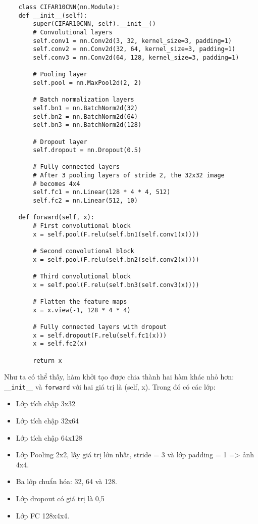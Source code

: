 \documentclass[../main.tex]{subfiles}
\begin{document}
\begin{verbatim}
    class CIFAR10CNN(nn.Module):
    def __init__(self):
        super(CIFAR10CNN, self).__init__()
        # Convolutional layers
        self.conv1 = nn.Conv2d(3, 32, kernel_size=3, padding=1)
        self.conv2 = nn.Conv2d(32, 64, kernel_size=3, padding=1)
        self.conv3 = nn.Conv2d(64, 128, kernel_size=3, padding=1)
        
        # Pooling layer
        self.pool = nn.MaxPool2d(2, 2)
        
        # Batch normalization layers
        self.bn1 = nn.BatchNorm2d(32)
        self.bn2 = nn.BatchNorm2d(64)
        self.bn3 = nn.BatchNorm2d(128)
        
        # Dropout layer
        self.dropout = nn.Dropout(0.5)
        
        # Fully connected layers
        # After 3 pooling layers of stride 2, the 32x32 image
        # becomes 4x4
        self.fc1 = nn.Linear(128 * 4 * 4, 512)
        self.fc2 = nn.Linear(512, 10)

    def forward(self, x):
        # First convolutional block
        x = self.pool(F.relu(self.bn1(self.conv1(x))))
        
        # Second convolutional block
        x = self.pool(F.relu(self.bn2(self.conv2(x))))
        
        # Third convolutional block
        x = self.pool(F.relu(self.bn3(self.conv3(x))))
        
        # Flatten the feature maps
        x = x.view(-1, 128 * 4 * 4)
        
        # Fully connected layers with dropout
        x = self.dropout(F.relu(self.fc1(x)))
        x = self.fc2(x)
        
        return x
\end{verbatim}

Như ta có thể thấy, hàm khởi tạo được chia thành hai hàm khác nhỏ hơn: \verb|__init__| và \verb|forward| với hai giá trị là (self, x). Trong đó có các lớp:

\begin{itemize}
    \item Lớp tích chập 3x32
    \item Lớp tích chập 32x64
    \item Lớp tích chập 64x128
    \item Lớp Pooling 2x2, lấy giá trị lớn nhất, stride = 3 và lớp padding = 1 => ảnh 4x4.
    \item Ba lớp chuẩn hóa: 32, 64 và 128.
    \item Lớp dropout có giá trị là 0,5
    \item Lớp FC 128x4x4.
\end{itemize}
\end{document}
